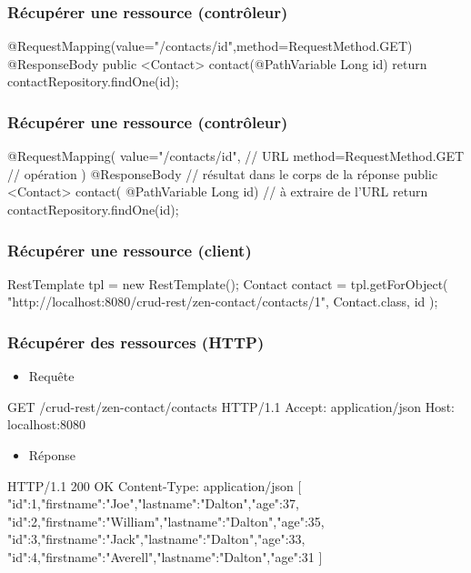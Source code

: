 \begin{frame}[fragile]
 \frametitle{Récupérer une ressource (contrôleur)}
 
 \begin{javacode}
@RequestMapping(value="/contacts/{id}",method=RequestMethod.GET)   
@ResponseBody                 
public <Contact> contact(@PathVariable Long id) {  
  return contactRepository.findOne(id);
}
 \end{javacode}  

\end{frame}

\begin{frame}[fragile]
 \frametitle{Récupérer une ressource (contrôleur)}
 
 \begin{javacode}
@RequestMapping(
  value="/contacts/{id}",     // URL
  method=RequestMethod.GET    // op\'eration
)
@ResponseBody                 // r\'esultat dans le corps de la r\'eponse
public <Contact> contact(
    @PathVariable Long id) {  // \`a extraire de l'URL
  return contactRepository.findOne(id);
}
 \end{javacode}  

\end{frame}

\begin{frame}[fragile]
 \frametitle{Récupérer une ressource (client)}
 
 \begin{javacode}
RestTemplate tpl = new RestTemplate();
Contact contact = tpl.getForObject(
  "http://localhost:8080/crud-rest/zen-contact/contacts/1", 
  Contact.class,
  id
);
 \end{javacode}  

\end{frame}

\begin{frame}[fragile]
 \frametitle{Récupérer des ressources (HTTP)}
 
 \begin{itemize}
  \item Requête
 \end{itemize} 
 
 \begin{textcode}
GET /crud-rest/zen-contact/contacts HTTP/1.1
Accept: application/json
Host: localhost:8080
 \end{textcode}
 
  \begin{itemize}
  \item Réponse
 \end{itemize} 
 
 \begin{textcode}
HTTP/1.1 200 OK
Content-Type: application/json
[
 {"id":1,"firstname":"Joe","lastname":"Dalton","age":37},
 {"id":2,"firstname":"William","lastname":"Dalton","age":35},
 {"id":3,"firstname":"Jack","lastname":"Dalton","age":33},
 {"id":4,"firstname":"Averell","lastname":"Dalton","age":31}
]
 \end{textcode}

\end{frame}

